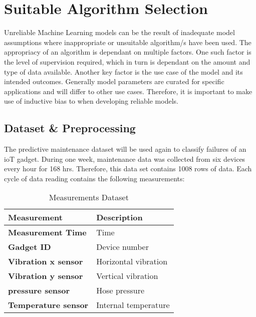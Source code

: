 
\chapter{Suitable Algorithm Selection}
Unreliable Machine Learning models can be the result of inadequate model assumptions where inappropriate or unsuitable algorithm/s have been used.
The appropriacy of an algorithm is dependant on multiple factors. One such factor is the level of supervision required, which in turn is dependant on the amount and type of data available.
Another key factor is the use case of the model and its intended outcomes. Generally model parameters are curated for specific applications and will differ to other use cases.
Therefore, it is important to make use of inductive bias\cite{saria2019tutorial} to when developing reliable models.

\section{Dataset \& Preprocessing}
The predictive maintenance dataset will be used again to classify failures of an ioT gadget.
During one week, maintenance data was collected from six devices every hour for 168 hrs.
Therefore, this data set contains 1008 rows of data. 
Each cycle of data reading contains the following measurements: 

\begin{table}[ht]
    \begin{center}
        \caption{Measurements Dataset} 
        \begin{tabular}{ l|l } 
         \toprule
         \textbf{Measurement} & \textbf{Description} \\  [0.5ex] 
         \midrule
         \textbf{Measurement Time} & Time \\
         \textbf{Gadget ID} & Device number \\
         \textbf{Vibration x sensor} & Horizontal vibration \\ 
         \textbf{Vibration y sensor} & Vertical vibration \\ 
         \textbf{pressure sensor} & Hose pressure \\
         \textbf{Temperature sensor} & Internal temperature \\
         \bottomrule
        \end{tabular}
    \end{center}
\end{table}

